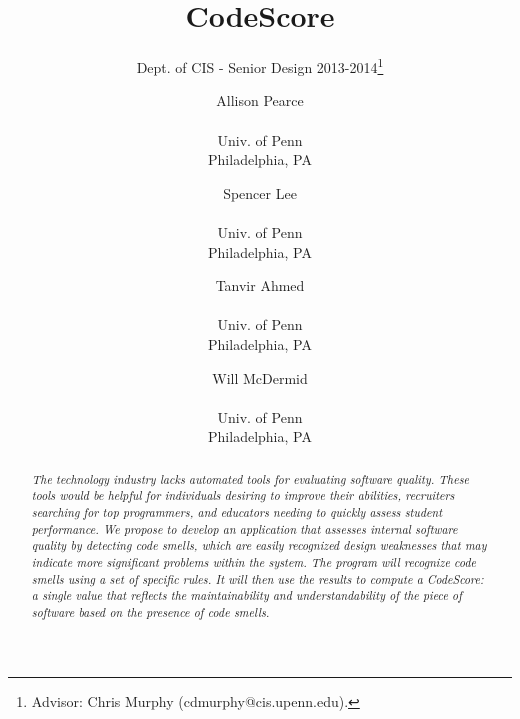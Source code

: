\documentclass{sig-alternate}
\begin{document}
 

\title{CodeScore}
\subtitle{Dept. of CIS - Senior Design 2013-2014\thanks{Advisor: Chris Murphy (cdmurphy@cis.upenn.edu).}}

\author{
Allison Pearce \\  \\ Univ. of Penn \\ Philadelphia, PA
\and Spencer Lee \\  \\ Univ. of Penn \\ Philadelphia, PA
\and Tanvir Ahmed \\  \\ Univ. of Penn \\ Philadelphia, PA
\and Will McDermid \\  \\ Univ. of Penn \\ Philadelphia, PA}

\date{}
\maketitle

\begin{abstract}
  \textit{The technology industry lacks automated tools for evaluating software quality. These tools would be helpful for individuals desiring to improve their abilities, recruiters searching for top programmers, and educators needing to quickly assess student performance. We propose to develop an application that assesses internal software quality by detecting code smells, which are easily recognized design weaknesses that may indicate more significant problems within the system. The program will recognize code smells using a set of specific rules. It will then use the results to compute a CodeScore: a single value that reflects the maintainability and understandability of the piece of software based on the presence of code smells. }
\end{abstract}

\end{document}
